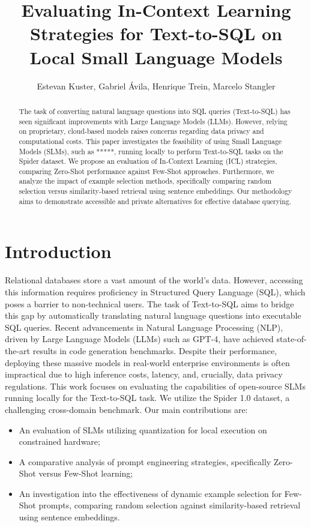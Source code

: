 \documentclass[12pt]{article}
\title{Evaluating In-Context Learning Strategies for Text-to-SQL on Local Small Language Models}
\author{Estevan Kuster\inst{1}, Gabriel Ávila\inst{1}, Henrique Trein\inst{1}, Marcelo Stangler\inst{1}}
\begin{document}
 

\maketitle

\begin{abstract}
  The task of converting natural language questions into SQL queries (Text-to-SQL) has seen significant improvements with Large Language Models (LLMs). However, relying on proprietary, cloud-based models raises concerns regarding data privacy and computational costs. This paper investigates the feasibility of using Small Language Models (SLMs), such as *****, running locally to perform Text-to-SQL tasks on the Spider dataset. We propose an evaluation of In-Context Learning (ICL) strategies, comparing Zero-Shot performance against Few-Shot approaches. Furthermore, we analyze the impact of example selection methods, specifically comparing random selection versus similarity-based retrieval using sentence embeddings. Our methodology aims to demonstrate accessible and private alternatives for effective database querying.
\end{abstract}

\section{Introduction}

Relational databases store a vast amount of the world's data. However, accessing this information requires proficiency in Structured Query Language (SQL), which poses a barrier to non-technical users. The task of Text-to-SQL aims to bridge this gap by automatically translating natural language questions into executable SQL queries. Recent advancements in Natural Language Processing (NLP), driven by Large Language Models (LLMs) such as GPT-4, have achieved state-of-the-art results in code generation benchmarks. Despite their performance, deploying these massive models in real-world enterprise environments is often impractical due to high inference costs, latency, and, crucially, data privacy regulations. This work focuses on evaluating the capabilities of open-source SLMs running locally for the Text-to-SQL task. We utilize the Spider 1.0 dataset, a challenging cross-domain benchmark. Our main contributions are:
\begin{itemize}
    \item An evaluation of SLMs utilizing quantization for local execution on constrained hardware;
    \item A comparative analysis of prompt engineering strategies, specifically Zero-Shot versus Few-Shot learning;
    \item An investigation into the effectiveness of dynamic example selection for Few-Shot prompts, comparing random selection against similarity-based retrieval using sentence embeddings.
\end{itemize}
\end{document}
